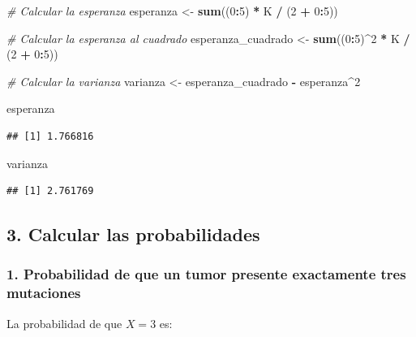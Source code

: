 \documentclass[
]{article}
\newenvironment{Shaded}{\begin{snugshade}}{\end{snugshade}}
\newcommand{\CommentTok}[1]{\textcolor[rgb]{0.56,0.35,0.01}{\textit{#1}}}
\newcommand{\DecValTok}[1]{\textcolor[rgb]{0.00,0.00,0.81}{#1}}
\newcommand{\FunctionTok}[1]{\textcolor[rgb]{0.13,0.29,0.53}{\textbf{#1}}}
\newcommand{\NormalTok}[1]{#1}
\newcommand{\OtherTok}[1]{\textcolor[rgb]{0.56,0.35,0.01}{#1}}
\newcommand{\SpecialCharTok}[1]{\textcolor[rgb]{0.81,0.36,0.00}{\textbf{#1}}}
\begin{document}
\begin{Shaded}
\begin{Highlighting}[]
\CommentTok{\# Calcular la esperanza}
\NormalTok{esperanza }\OtherTok{\textless{}{-}} \FunctionTok{sum}\NormalTok{((}\DecValTok{0}\SpecialCharTok{:}\DecValTok{5}\NormalTok{) }\SpecialCharTok{*}\NormalTok{ K }\SpecialCharTok{/}\NormalTok{ (}\DecValTok{2} \SpecialCharTok{+} \DecValTok{0}\SpecialCharTok{:}\DecValTok{5}\NormalTok{))}

\CommentTok{\# Calcular la esperanza al cuadrado}
\NormalTok{esperanza\_cuadrado }\OtherTok{\textless{}{-}} \FunctionTok{sum}\NormalTok{((}\DecValTok{0}\SpecialCharTok{:}\DecValTok{5}\NormalTok{)}\SpecialCharTok{\^{}}\DecValTok{2} \SpecialCharTok{*}\NormalTok{ K }\SpecialCharTok{/}\NormalTok{ (}\DecValTok{2} \SpecialCharTok{+} \DecValTok{0}\SpecialCharTok{:}\DecValTok{5}\NormalTok{))}

\CommentTok{\# Calcular la varianza}
\NormalTok{varianza }\OtherTok{\textless{}{-}}\NormalTok{ esperanza\_cuadrado }\SpecialCharTok{{-}}\NormalTok{ esperanza}\SpecialCharTok{\^{}}\DecValTok{2}

\NormalTok{esperanza}
\end{Highlighting}
\end{Shaded}

\begin{verbatim}
## [1] 1.766816
\end{verbatim}

\begin{Shaded}
\begin{Highlighting}[]
\NormalTok{varianza}
\end{Highlighting}
\end{Shaded}

\begin{verbatim}
## [1] 2.761769
\end{verbatim}

\subsection{3. Calcular las probabilidades}\label{calcular-las-probabilidades}

\subsubsection{1. Probabilidad de que un tumor presente exactamente tres mutaciones}\label{probabilidad-de-que-un-tumor-presente-exactamente-tres-mutaciones}

La probabilidad de que \(X = 3\) es:
\end{document}
